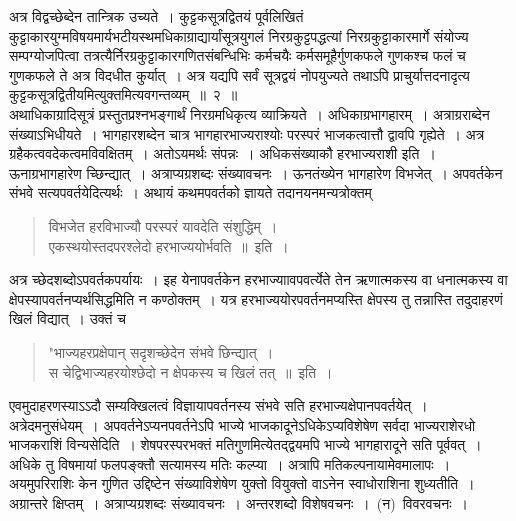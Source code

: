\documentclass[11pt, openany]{book}
\begin{document}

\newpage
\thispagestyle{fancy}
\fancyhf{}
\indent
अत्र विद्वच्छेब्देन तान्त्रिक उच्यते~। कुट्टकसूत्रद्वितयं पूर्वलिखितं कुट्टाकारयुग्मविषयमार्यभटीयस्थमधिकाग्राद्यार्यांसूत्रयुगलं निरग्रकुट्टपद्धत्यां निरग्रकुट्टाकारमार्गे संयोज्य सम्पग्योजपित्वा तत्रत्यैर्निरग्रकुट्टाकारगणितसंबन्धिभिः कर्मचयैः कर्मसमूहैर्गुणकफले गुणकश्च फलं च गुणकफले ते अत्र विदधीत कुर्यात्~। अत्र यद्यपि सर्वं सूत्रद्वयं नोपयुज्यते तथाऽपि प्राचुर्यात्तदनादृत्य कुट्टकसूत्रद्वितीयमित्युक्तमित्यवगन्तव्यम्~॥~२~॥\\

\indent
अथाधिकाग्रादिसूत्रं प्रस्तुतप्रश्नभङ्गार्थं निरग्रमधिकृत्य व्याक्रियते~। अधिकाग्रभागहारम्~। अत्राग्रराब्देन संख्याऽभिधीयते~। भागहारशब्देन चात्र भागहारभाज्यराश्योः परस्परं भाजकत्वात्तौ द्वावपि गृह्येते~। अत्र ग्रहैकत्ववदेकत्वमविवक्षितम्~। अतोऽयमर्थः संपन्नः~। अधिकसंख्याकौ हरभाज्यराशी इति~। ऊनाग्रभागहारेण च्छिन्द्यात्~। अत्राप्यग्रशब्दः संख्यावचनः~। ऊनतंख्येन भागहारेण विभजेत्~। अपवर्तकेन संभवे सत्यपवर्तयेदित्यर्थः~। अथायं कथमपवर्तको ज्ञायते तदानयनमन्यत्रोक्तम्\textendash
\hspace{1cm}
\begin{quote}
{\qt
विभजेत हरविभाज्यौ परस्परं यावदेति संशुद्धिम्~।\\
एकस्थयोस्तदपरश्लेदो हरभाज्ययोर्भवति~॥~इति~।}
\end{quote}
\indent
अत्र च्छेदशब्दोऽपवर्तकपर्यायः~। इह येनापवर्तकेन हरभाज्याावपवर्त्येते तेन ऋणात्मकस्य वा धनात्मकस्य वा क्षेपस्यापवर्तनप्यर्थसिद्धमिति न कण्ठोक्तम्~। यत्र हरभाज्ययोरपवर्तनमप्यस्ति क्षेपस्य तु तन्नास्ति तदुदाहरणं खिलं विद्यात्~। उक्तं च \textendash
{\begin{quote}
\qt
"भाज्यहरप्रक्षेपान् सदृशच्छेदेन संभवे छिन्द्यात्~।\\
स चेद्विभाज्यहरयोश्छेदो न क्षेपकस्य च खिलं तत्~॥~इति~।
\end{quote}}
\indent
एवमुदाहरणस्याऽऽदौ सम्यक्खिलत्वं विज्ञायापवर्तनस्य संभवे सति हरभाज्यक्षेपानपवर्तयेत्~। अत्रेदमनुसंधेयम्~। अपवर्तनेऽप्यनपवर्तनेऽपि भाज्ये भाजकादूनेऽधिकेऽप्यविशेषेण सर्वदा भाज्यराशेरधो भाजकराशिं विन्यसेदिति~। शेषपरस्परभक्तं मतिगुणमित्येतद्द्वयमपि भाज्ये भागहारादूने सति पूर्ववत्~। अधिके तु विषमायां फलपङ्क्तौ सत्यामस्य मतिः कल्प्या~। अत्रापि मतिकल्पनायामेवमालापः~। अयमुपरिराशिः केन गुणित उद्दिष्टेन संख्याविशेषेण युक्तो वियुक्तो वाऽनेन स्वाधोराशिना शुध्यतीति~। अग्रान्तरे क्षिप्तम्~। अत्राप्यग्रशब्दः संख्यावचनः~। अन्तरशब्दो विशेषवचनः~।~(न)~विवरवचनः~।
\end{document}
